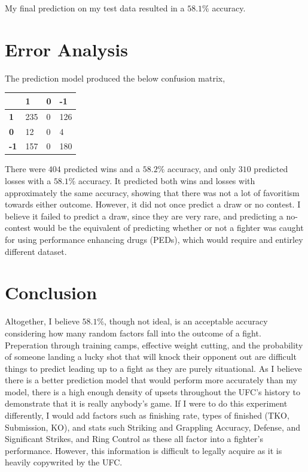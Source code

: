 \documentclass[12pt]{article}
\begin{document}
My final prediction on my test data resulted in a $58.1\%$ accuracy.


\section{Error Analysis}

The prediction model produced the below confusion matrix,

\begin{table}[h!]
\centering
\begin{tabular}{|l|l|l|l|}
\hline
            & \textbf{1} & \textbf{0} & \textbf{-1} \\ \hline
\textbf{1}  & 235        & 0          & 126         \\ \hline
\textbf{0}  & 12         & 0          & 4           \\ \hline
\textbf{-1} & 157        & 0          & 180         \\ \hline
\end{tabular}
\end{table}

There were $404$ predicted wins and a $58.2\%$ accuracy, and only $310$ predicted losses with a $58.1\%$ accuracy. It predicted both wins and losses with approximately the same accuracy, showing that there was not a lot of favoritism towards either outcome. However, it did not once predict a draw or no contest. I believe it failed to predict a draw, since they are very rare, and predicting a no-contest would be the equivalent of predicting whether or not a fighter was caught for using performance enhancing drugs (PEDs), which would require and entirley different dataset.

\section{Conclusion}

Altogether, I believe $58.1\%$, though not ideal, is an acceptable accuracy considering how many random factors fall into the outcome of a fight. Preperation through training camps, effective weight cutting, and the probability of someone landing a lucky shot that will knock their opponent out are difficult things to predict leading up to a fight as they are purely situational. As I believe there is a better prediction model that would perform more accurately than my model, there is a high enough density of upsets throughout the UFC's history to demonstrate that it is really anybody's game. If I were to do this experiment differently, I would add factors such as finishing rate, types of finished (TKO, Submission, KO), and stats such Striking and Grappling Accuracy, Defense, and Significant Strikes, and Ring Control as these all factor into a fighter's performance. However, this information is difficult to legally acquire as it is heavily copywrited by the UFC.
\end{document}

